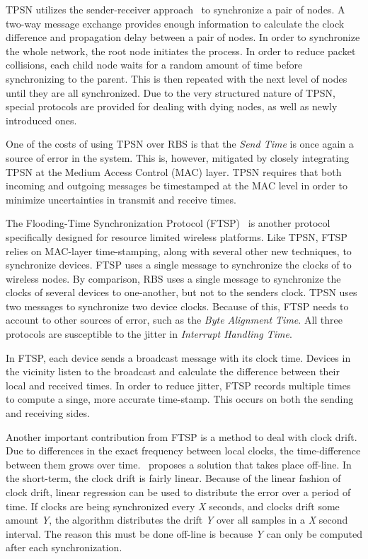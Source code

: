 TPSN utilizes the sender-receiver approach~\cite{synchronization:NTP} to synchronize a pair of nodes. A two-way message exchange provides enough information to calculate the clock difference and propagation delay between a pair of nodes. In order to synchronize the whole network, the root node initiates the process. In order to reduce packet collisions, each child node waits for a random amount of time before synchronizing to the parent. This is then repeated with the next level of nodes until they are all synchronized. Due to the very structured nature of TPSN, special protocols are provided for dealing with dying nodes, as well as newly introduced ones.

One of the costs of using TPSN over RBS is that the \emph{Send Time} is once again a source of error in the system. This is, however, mitigated by closely integrating TPSN at the Medium Access Control (MAC) layer. TPSN requires that both incoming and outgoing messages be timestamped at the MAC level in order to minimize uncertainties in transmit and receive times. 

The Flooding-Time Synchronization Protocol (FTSP)~\cite{synchronization:FTSP} is another protocol specifically designed for resource limited wireless platforms. Like TPSN, FTSP relies on MAC-layer time-stamping, along with several other new techniques, to synchronize devices. FTSP uses a single message to synchronize the clocks of to wireless nodes. By comparison, RBS uses a single message to synchronize the clocks of several devices to one-another, but not to the senders clock. TPSN uses two messages to synchronize two device clocks. Because of this, FTSP needs to account to other sources of error, such as the \emph{Byte Alignment Time}. All three protocols are susceptible to the jitter in \emph{Interrupt Handling Time}.

In FTSP, each device sends a broadcast message with its clock time. Devices in the vicinity listen to the broadcast and calculate the difference between their local and received times. In order to reduce jitter, FTSP records multiple times to compute a singe, more accurate time-stamp. This occurs on both the sending and receiving sides. 

Another important contribution from FTSP is a method to deal with clock drift. Due to differences in the exact frequency between local clocks, the time-difference between them grows over time.~\cite{synchronization:FTSP} proposes a solution that takes place off-line. In the short-term, the clock drift is fairly linear. Because of the linear fashion of clock drift, linear regression can be used to distribute the error over a period of time. If clocks are being synchronized every \emph{X} seconds, and clocks drift some amount \emph{Y}, the algorithm distributes the drift \emph{Y} over all samples in a \emph{X} second interval. The reason this must be done off-line is because \emph{Y} can only be computed after each synchronization. 

